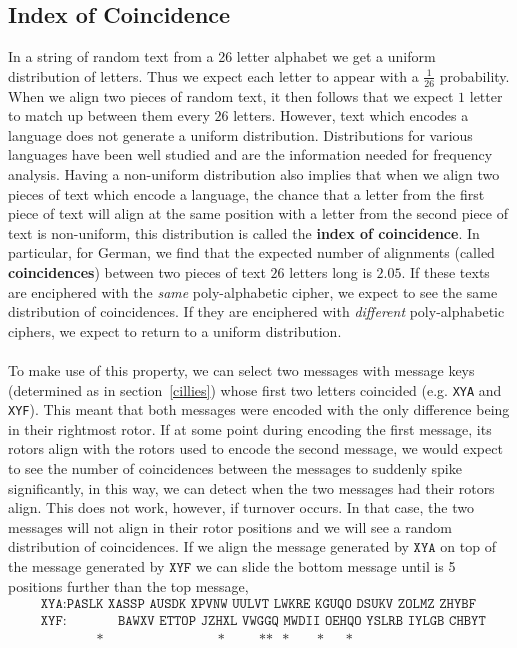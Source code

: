 \subsection{Index of Coincidence}\label{ioc}
In a string of random text from a 26 letter alphabet we get a uniform
distribution of letters. Thus we expect each letter to appear with a
$\frac{1}{26}$ probability. When we align two pieces of random text,
it then follows that we expect $1$ letter to match up between them
every $26$ letters. However, text which encodes a language does
not generate a uniform distribution. Distributions for various
languages have been well studied and are the information needed for
frequency analysis. Having a non-uniform distribution also implies
that when we align two pieces of text which encode a language, the
chance that a letter from the first piece of text will align at the
same position with a letter
from the second piece of text is non-uniform, this distribution is
called the {\bf{index of coincidence}}. In particular, for German, we
find that the expected number of alignments (called
	{\bf{coincidences}}) between two pieces of text $26$ letters long is
$2.05$. If these texts
are enciphered with the \emph{same} poly-alphabetic cipher, we expect
to see the same distribution of coincidences. If they are enciphered
with \emph{different} poly-alphabetic ciphers, we expect to return to
a uniform distribution.
\\\\To make use of this property, we can select two messages with
message keys (determined as in section~\ref{cillies}) whose first two
letters coincided (e.g. \texttt{XYA} and
\texttt{XYF}). This meant that both messages were encoded with the
only difference being in their rightmost rotor. If at some point
during encoding the first message, its rotors align with the rotors
used to encode the second message, we would expect to see the number
of coincidences between the messages to suddenly spike significantly,
in this way, we can detect when the two messages had their rotors
align. This does not work, however, if turnover occurs. In that case, the two
messages will not align in their rotor positions and we will see a
random distribution of coincidences. If we align the message
generated by $\texttt{XYA}$ on top of the message generated by
$\texttt{XYF}$ we can slide the bottom message until is 5 positions
further than the top message,
\begin{align*}
	 & \texttt{XYA}: \texttt{PASLK XASSP AUSDK XPVNW UULVT LWKRE KGUQO
		DSUKV ZOLMZ ZHYBF}
	\\
	 & \texttt{XYF}: \texttt{ }\texttt{ }\texttt{ }\texttt{ }\texttt{
	}\texttt{ }\texttt{BAWXV ETTOP JZHXL VWGGQ MWDII OEHQO YSLRB IYLGB
		CHBYT }
	\\
	 &
	\ \ \ \ \ \ \ \ \ \ \ \ \ \ \ \ \ \ \texttt{*}\ \ \ \ \ \ \ \ \ \ \ \ \ \ \ \ \ \ \ \ \ \ \ \ \ \ \ \ \ \ \ \ \ \ \ \ \ \texttt{*}\ \ \ \ \ \ \ \ \ \ \ \texttt{**}\ \ \ \texttt{*}\ \ \ \ \ \ \ \ \ \texttt{*}\ \ \ \ \ \ \ \texttt{*}
\end{align*}
